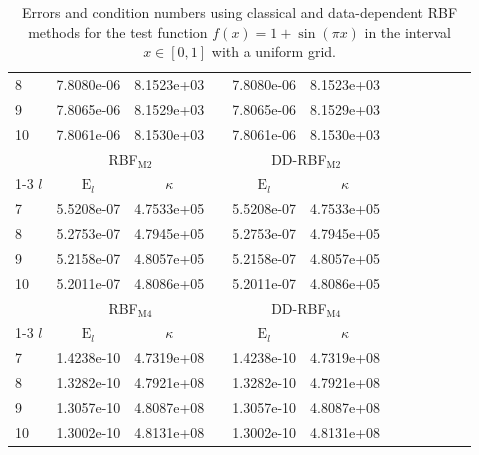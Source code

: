 \documentclass[preprint]{elsarticle}       %
\begin{document}
\begin{table}[!ht]
\begin{center}
\begin{tabular}{lccccccccccc}
8 &7.8080e-06 & 8.1523e+03 && 7.8080e-06 & 8.1523e+03 && \\
9 &7.8065e-06 & 8.1529e+03 && 7.8065e-06 & 8.1529e+03 && \\
10 &7.8061e-06 & 8.1530e+03 && 7.8061e-06 & 8.1530e+03 && \\
\hline
\hline
& \multicolumn{2}{c}{RBF$_{\text{M2}}$} & &   \multicolumn{2}{c}{DD-RBF$_{\text{M2}}$}\\ \cline{1-3} \cline{5-7} $l$ & $\text{E}_l$ & $\kappa$ & &$\text{E}_l$ & $\kappa$ \\
7 &5.5208e-07 & 4.7533e+05 && 5.5208e-07 & 4.7533e+05 && \\
8 &5.2753e-07 & 4.7945e+05 && 5.2753e-07 & 4.7945e+05 && \\
9 &5.2158e-07 & 4.8057e+05 && 5.2158e-07 & 4.8057e+05 && \\
10 &5.2011e-07 & 4.8086e+05 && 5.2011e-07 & 4.8086e+05 && \\
\hline
\hline
& \multicolumn{2}{c}{RBF$_{\text{M4}}$} & &   \multicolumn{2}{c}{DD-RBF$_{\text{M4}}$}\\ \cline{1-3} \cline{5-7} $l$ & $\text{E}_l$ & $\kappa$ & &$\text{E}_l$ & $\kappa$ \\
7 &1.4238e-10 & 4.7319e+08 && 1.4238e-10 & 4.7319e+08 && \\
8 &1.3282e-10 & 4.7921e+08 && 1.3282e-10 & 4.7921e+08 && \\
9 &1.3057e-10 & 4.8087e+08 && 1.3057e-10 & 4.8087e+08 && \\
10 &1.3002e-10 & 4.8131e+08 && 1.3002e-10 & 4.8131e+08 && \\
\hline
\end{tabular}
\end{center}
\caption{Errors and condition numbers using classical and data-dependent RBF methods for the test function $f(x)=1+\sin(\pi x)$ in the interval $x\in[0,1]$ with a uniform grid.}\label{texp1}
\end{table}
\end{document}
